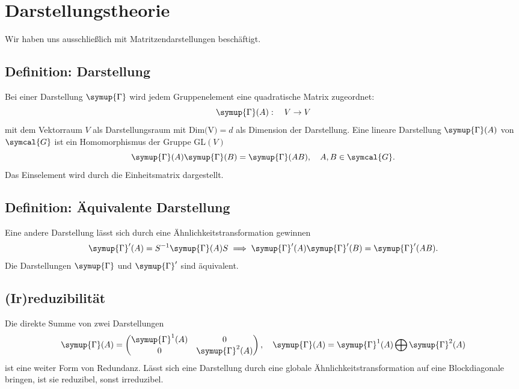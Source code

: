 \documentclass[
  captions=tableheading,  %
  titlepage=firstiscover, %
]{scrartcl}
\begin{document}
\section{Darstellungstheorie}
Wir haben uns ausschließlich mit Matritzendarstellungen beschäftigt.
\subsection{Definition: Darstellung}
Bei einer Darstellung $\symup{\Gamma}$ wird jedem Gruppenelement eine quadratische Matrix zugeordnet:
\begin{equation*}
  \symup{\Gamma}(A) : \quad V \to V
\end{equation*}
mit dem Vektorraum $V$ als Darstellungsraum mit $\text{Dim(V)} = d$ als 
Dimension der Darstellung.
Eine lineare Darstellung $\symup{\Gamma} (A)$ von $\symcal{G}$ ist ein Homomorphismus der Gruppe GL$(V)$
\begin{equation*}
  \symup{\Gamma}(A) \symup{\Gamma}(B) = \symup{\Gamma}(AB), \quad A,B \in \symcal{G}.
\end{equation*} 
Das Einselement wird durch die Einheitsmatrix dargestellt.
\subsection{Definition: Äquivalente Darstellung}
Eine andere Darstellung lässt sich durch eine Ähnlichkeitstransformation gewinnen
\begin{equation*}
  \symup{\Gamma}'(A) = S^{-1} \symup{\Gamma} (A) S \implies \symup{\Gamma}'(A) \symup{\Gamma}'(B) = \symup{\Gamma}'(AB).
\end{equation*}
Die Darstellungen $\symup{\Gamma}$ und $\symup{\Gamma}'$ sind äquivalent.
\subsection{(Ir)reduzibilität}
Die direkte Summe von zwei Darstellungen 
\begin{equation*}
  \symup{\Gamma} (A) = 
  \begin{pmatrix}
    \symup{\Gamma}^1 (A)  & 0           \\
    0             & \symup{\Gamma}^2(A)
  \end{pmatrix}
  , \quad \symup{\Gamma} (A) = \symup{\Gamma}^1 (A)\bigoplus \symup{\Gamma}^2(A)
\end{equation*}
ist eine weiter Form von Redundanz.
Lässt sich eine Darstellung durch eine globale Ähnlichkeitstransformation auf eine Blockdiagonale
bringen, ist sie reduzibel, sonst irreduzibel.
\end{document}

